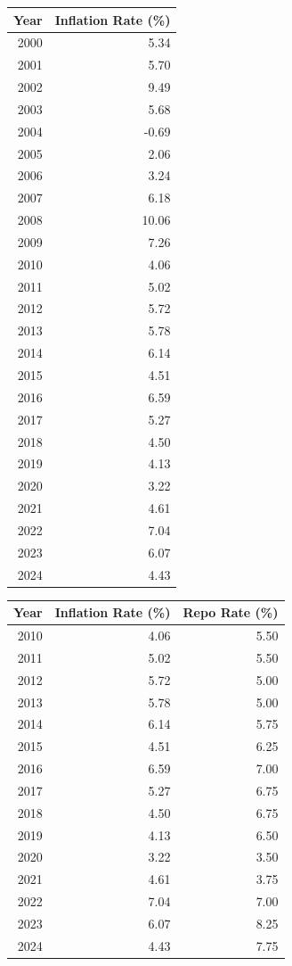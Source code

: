 \documentclass[11pt,preprint]{elsarticle}
\let\origtable\table
\let\endorigtable\endtable
\renewenvironment{table}[1][2] {
    \expandafter\origtable\expandafter[H]
} {
    \endorigtable
}
\numberwithin{equation}{section}
\numberwithin{figure}{section}
\numberwithin{table}{section}
\begin{document}
\begin{table}[H]
\centering
\begin{tabular}{rr}
  \hline
Year & Inflation Rate (\%) \\ 
  \hline
2000 & 5.34 \\ 
  2001 & 5.70 \\ 
  2002 & 9.49 \\ 
  2003 & 5.68 \\ 
  2004 & -0.69 \\ 
  2005 & 2.06 \\ 
  2006 & 3.24 \\ 
  2007 & 6.18 \\ 
  2008 & 10.06 \\ 
  2009 & 7.26 \\ 
  2010 & 4.06 \\ 
  2011 & 5.02 \\ 
  2012 & 5.72 \\ 
  2013 & 5.78 \\ 
  2014 & 6.14 \\ 
  2015 & 4.51 \\ 
  2016 & 6.59 \\ 
  2017 & 5.27 \\ 
  2018 & 4.50 \\ 
  2019 & 4.13 \\ 
  2020 & 3.22 \\ 
  2021 & 4.61 \\ 
  2022 & 7.04 \\ 
  2023 & 6.07 \\ 
  2024 & 4.43 \\ 
   \hline
\end{tabular}
\caption{Annual Inflation Rate in South Africa (2000–2024) \label{tab8}} 
\end{table}

\begin{table}[H]
\centering
\begin{tabular}{rrr}
  \hline
Year & Inflation Rate (\%) & Repo Rate (\%) \\ 
  \hline
2010 & 4.06 & 5.50 \\ 
  2011 & 5.02 & 5.50 \\ 
  2012 & 5.72 & 5.00 \\ 
  2013 & 5.78 & 5.00 \\ 
  2014 & 6.14 & 5.75 \\ 
  2015 & 4.51 & 6.25 \\ 
  2016 & 6.59 & 7.00 \\ 
  2017 & 5.27 & 6.75 \\ 
  2018 & 4.50 & 6.75 \\ 
  2019 & 4.13 & 6.50 \\ 
  2020 & 3.22 & 3.50 \\ 
  2021 & 4.61 & 3.75 \\ 
  2022 & 7.04 & 7.00 \\ 
  2023 & 6.07 & 8.25 \\ 
  2024 & 4.43 & 7.75 \\ 
   \hline
\end{tabular}
\caption{Annual Inflation and Repo Rate in South Africa (2000–2024) \label{tab9}} 
\end{table}


\end{document}
